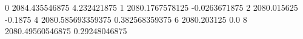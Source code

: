 0 2084.435546875 4.232421875
1 2080.1767578125 -0.0263671875
2 2080.015625 -0.1875
4 2080.585693359375 0.382568359375
6 2080.203125 0.0
8 2080.49560546875 0.29248046875
